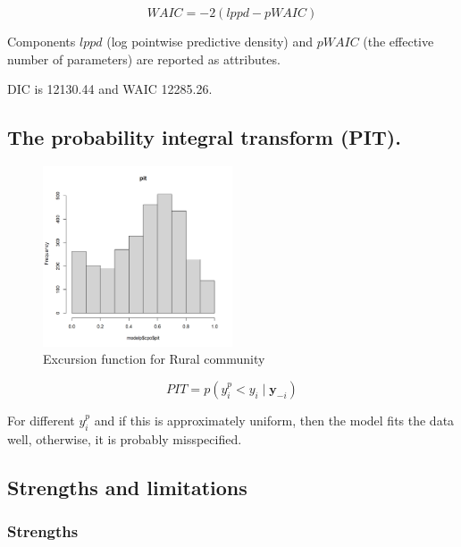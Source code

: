 \documentclass{mcmthesis}
\begin{document}
$$
WAIC=-2(lppd-pWAIC)
$$

Components  $lppd$  (log pointwise predictive density) and  $pWAIC$  (the effective number of parameters) are reported as attributes.

DIC is 12130.44 and WAIC 12285.26.

\subsection{The probability integral transform (PIT).}

\begin{figure}[htp]
    \centering
    \includegraphics[width=0.5\textwidth]{images/ppt11111.png}
    \caption{Excursion function for Rural community}
    \label{pre1}
\end{figure}

$$
PIT=p\left(y_{i}^{p}<y_{i} \mid \boldsymbol{y}_{-i}\right)
$$

For different  $y_{i}^{p}$  and if this is approximately uniform, then the model fits the data well, otherwise, it is probably misspecified.

\subsection{Strengths and limitations}

\subsubsection{Strengths}
\end{document}

